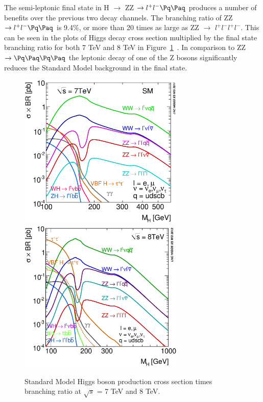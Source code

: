 The semi-leptonic final state in H $\rightarrow$ ZZ $\rightarrow l^{+}l^{-} \Pq \Paq$ produces a number of benefits over the previous two decay channels.  The branching ratio of ZZ $\rightarrow l^{+}l^{-} \Pq \Paq$ is 9.4\%, or more than 20 times as large as ZZ $\rightarrow$ $l^{+}l^{-}l^{+}l^{-}$. This can be seen in the plots of Higgs decay cross section multiplied by the final state branching ratio for both 7 TeV and 8 TeV in Figure~\ref{fig:XSBR}~\cite{LHC_Higgs_Gallery}. In comparison to ZZ $\rightarrow \Pq \Paq \Pq \Paq$ the leptonic decay of one of the Z bosons significantly reduces the Standard Model background in the final state.

\begin{figure}[htb]
\centering
\includegraphics[width=0.7\textwidth]{StandardModel/XSBR_7TeV_SM.eps} \includegraphics[width=0.7\textwidth]{StandardModel/XSBR_8TeV_SM_HM.eps}
\caption{\small Standard Model Higgs boson production cross section times branching ratio at $\sqrt{s}$ = 7 TeV and 8 TeV. ~\cite{LHC_Higgs_Gallery}
         }
\label{fig:XSBR}
\end{figure}



